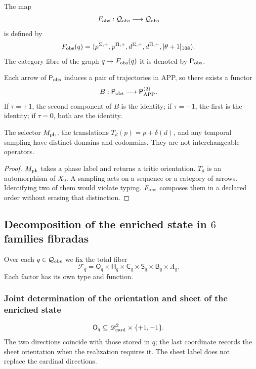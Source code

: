 {\begin{definition}
\label{p12-83-c1-s3:def:tpk-evolucion-observable}
The map
\[
 F_{\rm obs}:\mathcal Q_{\rm obs}\longrightarrow\mathcal Q_{\rm obs}
\]
is defined by
\[
 F_{\rm obs}(q)=
 (p^{\Sigma,+},p^{\Pi,+},d^{\Sigma,+},d^{\Pi,+},[\theta+1]_{108}).
\]
The category libre of the graph \(q\to F_{\rm obs}(q)\) it is denoted by
\(\mathsf P_{\rm obs}\).
\end{definition}

Each arrow of \(\mathsf P_{\rm obs}\) induces a pair of trajectories in
APP, so there exists a functor
\[
 B:\mathsf P_{\rm obs}\longrightarrow
 \mathsf P_{\rm APP}^{(2)}.
\]
If \(\tau=+1\), the second component of \(B\) is the identity; if
\(\tau=-1\), the first is the identity; if \(\tau=0\), both are the identity.

\begin{proposition}
\label{p12-83-c1-s3:prop:tpk-separacion-seleccion-movimiento}
The selector \(M_{\rm ph}\), the translations
\(T_d(p)=p+\delta(d)\), and any temporal sampling have distinct domains and
codomains. They are not interchangeable operators.
\end{proposition}

\begin{proof}
\(M_{\rm ph}\) takes a phase label and returns a tritic orientation.
\(T_d\) is an automorphism of \(X_9\). A sampling acts on a
sequence or a category of arrows. Identifying two of them would violate
typing. \(F_{\rm obs}\) composes them in a declared order without erasing that
distinction.
\end{proof}

\subsection{Decomposition of the enriched state in \(6\) families fibradas}

Over each \(q\in\mathcal Q_{\rm obs}\) we fix the total fiber
\[
 \mathcal F_q=
 \mathsf O_q\times
 \mathsf H_q\times
 \mathsf C_q\times
 \mathsf S_q\times
 \mathsf B_q\times
 \Lambda_q.
\]
Each factor has its own type and function.

\subsubsection{Joint determination of the orientation and sheet of the enriched state}

\[
 \mathsf O_q\subseteq
 \mathscr D_{\rm card}^2\times\{+1,-1\}.
\]
The two directions coincide with those stored in \(q\); the last
coordinate records the sheet orientation when the realization requires it.
The sheet label does not replace the cardinal directions.

}
